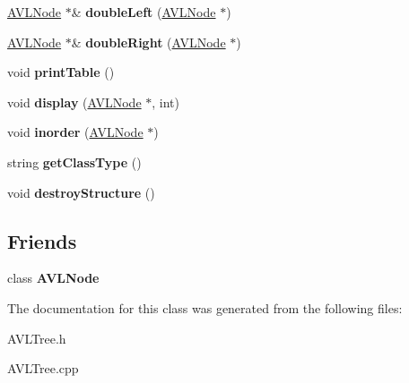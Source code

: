 \begin{DoxyCompactItemize}
\item 
\hypertarget{class_a_v_l_tree_aae25b3c2ba45785f14e6460f7da27a90}{\hyperlink{class_a_v_l_node}{A\+V\+L\+Node} $\ast$\& {\bfseries double\+Left} (\hyperlink{class_a_v_l_node}{A\+V\+L\+Node} $\ast$)}\label{class_a_v_l_tree_aae25b3c2ba45785f14e6460f7da27a90}

\item 
\hypertarget{class_a_v_l_tree_a52414545fb12fa95fd4b48410e32a90f}{\hyperlink{class_a_v_l_node}{A\+V\+L\+Node} $\ast$\& {\bfseries double\+Right} (\hyperlink{class_a_v_l_node}{A\+V\+L\+Node} $\ast$)}\label{class_a_v_l_tree_a52414545fb12fa95fd4b48410e32a90f}

\item 
\hypertarget{class_a_v_l_tree_aaeb00045be61c381863d43526b4dffe1}{void {\bfseries print\+Table} ()}\label{class_a_v_l_tree_aaeb00045be61c381863d43526b4dffe1}

\item 
\hypertarget{class_a_v_l_tree_aadb95e92d5560738574ae428ae2df980}{void {\bfseries display} (\hyperlink{class_a_v_l_node}{A\+V\+L\+Node} $\ast$, int)}\label{class_a_v_l_tree_aadb95e92d5560738574ae428ae2df980}

\item 
\hypertarget{class_a_v_l_tree_a3857ebba2ac14e0fd1ded8f1c6cb224c}{void {\bfseries inorder} (\hyperlink{class_a_v_l_node}{A\+V\+L\+Node} $\ast$)}\label{class_a_v_l_tree_a3857ebba2ac14e0fd1ded8f1c6cb224c}

\item 
\hypertarget{class_a_v_l_tree_a708b6398ea1771de3077ca39c4005cca}{string {\bfseries get\+Class\+Type} ()}\label{class_a_v_l_tree_a708b6398ea1771de3077ca39c4005cca}

\item 
\hypertarget{class_a_v_l_tree_abd8e3d01e9aa36276fd29d04e64f6def}{void {\bfseries destroy\+Structure} ()}\label{class_a_v_l_tree_abd8e3d01e9aa36276fd29d04e64f6def}

\end{DoxyCompactItemize}
\subsection*{Friends}
\begin{DoxyCompactItemize}
\item 
\hypertarget{class_a_v_l_tree_aefbabd2f704298b266a25d1a555a63f0}{class {\bfseries A\+V\+L\+Node}}\label{class_a_v_l_tree_aefbabd2f704298b266a25d1a555a63f0}

\end{DoxyCompactItemize}


The documentation for this class was generated from the following files\+:\begin{DoxyCompactItemize}
\item 
A\+V\+L\+Tree.\+h\item 
A\+V\+L\+Tree.\+cpp\end{DoxyCompactItemize}
